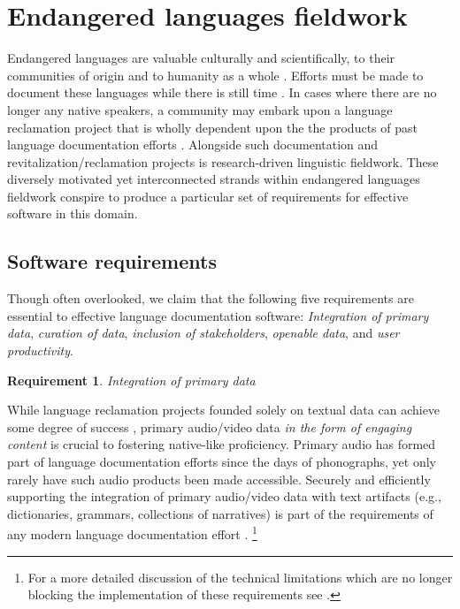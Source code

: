 \documentclass[11pt]{article}
\newtheorem{requirement}{Requirement}
\begin{document}

\section{Endangered languages fieldwork}\label{sec:fieldwork}

Endangered languages are valuable culturally and scientifically, to their
communities of origin \cite{Ironstrack:2012} and to humanity as a whole
\cite{harrison2007languages}. Efforts must be made to document these languages
while there is still time \cite{Good:2012,Thieberger:2012}. 
In cases where there are no longer
any native speakers, a community may embark upon a language reclamation project
that is wholly dependent upon the the products of past language documentation
efforts \cite{Leonard:2012,Costa:2012}. Alongside such documentation and
revitalization/reclamation projects is research-driven linguistic fieldwork.
These diversely motivated yet interconnected strands within endangered
languages fieldwork conspire to produce a particular set of requirements for
effective software in this domain.


\subsection{Software requirements}
\label{sec:requirements}

Though often overlooked, we claim that the following five requirements are
essential to effective language documentation software: \emph{Integration of
primary data}, \emph{curation of data}, \emph{inclusion of stakeholders},
\emph{openable data}, and \emph{user productivity}.


\begin{requirement}
	\label{req:primary-data}
       Integration of primary data
\end{requirement}

While language reclamation projects founded solely on textual data can achieve
some degree of success \cite{Ironstrack:2012}, primary audio/video data \emph{in the
form of engaging content} is crucial to fostering native-like proficiency.
Primary audio has formed part of language documentation efforts since
the days of phonographs, yet only rarely have such audio products
been made accessible. Securely and efficiently supporting the integration of
primary audio/video data with text artifacts (e.g., dictionaries, grammars,
collections of narratives) is part of the requirements of any modern language
documentation effort \cite{Schroeter:2006,Good:2012b}.%
\footnote{For a more detailed discussion of the technical limitations which are
    no longer blocking the implementation of these requirements see
\cite{lingsync:2012}.}
\end{document}
